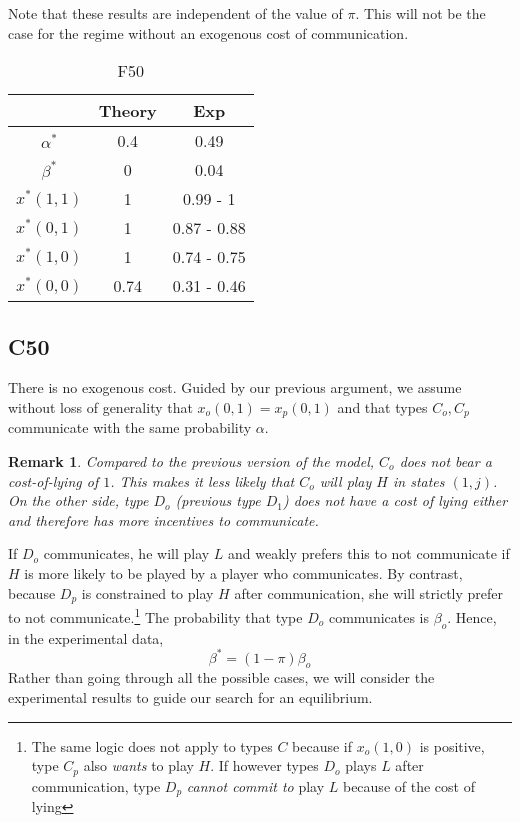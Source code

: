 \documentclass[12pt]{article}
\newtheorem{remark}{Remark}
\begin{document}
Note that these results are independent of the value of $\pi$. This will not be the case for the regime without an exogenous cost of communication.
\begin{table}[h!]
\begin{center}
	\begin{tabular}{c c c}
			& Theory 	& Exp \\
			\hline
			$\alpha^*$ 	& 0.4	& 0.49\\
			$\beta^*$ 	& 0 & 0.04\\ 
			\hline
			$x^*(1,1)$ 	& 1	& 0.99 - 1\\ 
			$x^*(0,1)$ & 1 & 0.87 - 0.88\\ 
			$x^*(1,0)$ & 1 & 0.74 - 0.75\\
			$x^*(0,0)$ & 0.74 &  0.31 - 0.46\\ 
			\hline
	\end{tabular}
	\end{center}
	\label{F50}
	\caption{F50}	
\end{table}

\subsection{C50}
There is no exogenous cost. Guided by our previous argument, we assume without loss of generality that $x_o(0,1)=x_p(0,1)$ and that types $C_o,C_p$ communicate with the same probability $\alpha$. 

\begin{remark}
Compared to the previous version of the model, $C_o$ does not bear a cost-of-lying of $1$. This makes it \emph{less} likely that $C_o$ will play $H$ in states $(1,j)$. On the other side, type $D_o$ (previous type $D_1$) does not have a cost of lying either and therefore has \emph{more incentives to communicate}.	
\end{remark}

If $D_o$ communicates, he will play $L$ and weakly prefers this to not communicate if $H$ is more likely to be played by a player who communicates. By contrast, because $D_p$ is constrained to play $H$ after communication, she will strictly prefer to not communicate.\footnote{%
The same logic does not apply to types $C$ because if $x_o(1,0)$ is positive, type $C_p$ also \emph{wants} to play $H$. If however types $D_o$ plays $L$ after communication, type $D_p$ \emph{cannot commit to} play $L$ because of the cost of lying}
 The probability that type $D_o$ communicates is $\beta_o$. Hence, in the experimental data, 
\[
	\beta^*=(1-\pi)\beta_o
\]
%
Rather than going through all the possible cases, we will consider the experimental results to guide our search for an equilibrium.
\end{document}
